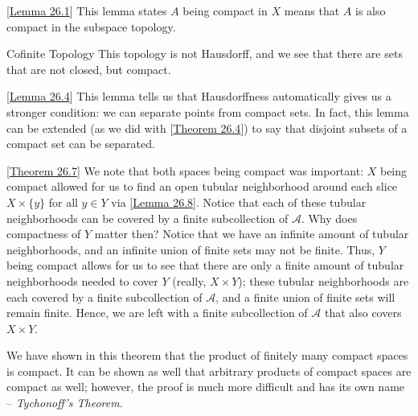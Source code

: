 \begin{remarkBox}{[\hyperlink{lem:26.1}{Lemma 26.1}]}
    This lemma states \( A \) being compact in \( X \) means that \( A \) is 
    also compact in the subspace topology.
\end{remarkBox}

\begin{remarkBox}{Cofinite Topology}
    This topology is not Hausdorff, and we see that there are sets that are
    not closed, but compact.
\end{remarkBox}

\begin{remarkBox}{[\hyperlink{lem:26.4}{Lemma 26.4}]}
    This lemma tells us that Hausdorffness automatically gives us a stronger
    condition: we can separate points from compact sets.
    In fact, this lemma can be extended (as we did with 
    [\hyperlink{thm:26.4}{Theorem 26.4}]) to say that disjoint subsets of 
    a compact set can be separated.
\end{remarkBox}

\begin{remarkBox}{[\hyperlink{thm:26.7}{Theorem 26.7}]}
    We note that both spaces being compact was important: \( X \) being compact
    allowed for us to find an open tubular neighborhood around each slice
    \( X \times \{ y \} \) for all \( y \in Y \) via
    [\hyperlink{lem:26.8}{Lemma 26.8}].
    Notice that each of these tubular neighborhoods can be covered by a finite
    subcollection of \( \mathcal{A} \).
    Why does compactness of \( Y \) matter then?
    Notice that we have an infinite amount of tubular neighborhoods, and an
    infinite union of finite sets may not be finite.
    Thus, \( Y \) being compact allows for us to see that there are only a 
    finite amount of tubular neighborhoods needed to cover \( Y \) (really,
    \( X \times Y \)); these tubular neighborhoods are each covered by a finite
    subcollection of \( \mathcal{A} \), and a finite union of finite sets will
    remain finite.
    Hence, we are left with a finite subcollection of \( \mathcal{A} \) that
    also covers \( X \times Y \).

    \baseRule
    
    We have shown in this theorem that the product of finitely many compact 
    spaces is compact.
    It can be shown as well that arbitrary products of compact spaces are
    compact as well; however, the proof is much more difficult and has its 
    own name -- \textit{Tychonoff's Theorem}.
\end{remarkBox}

